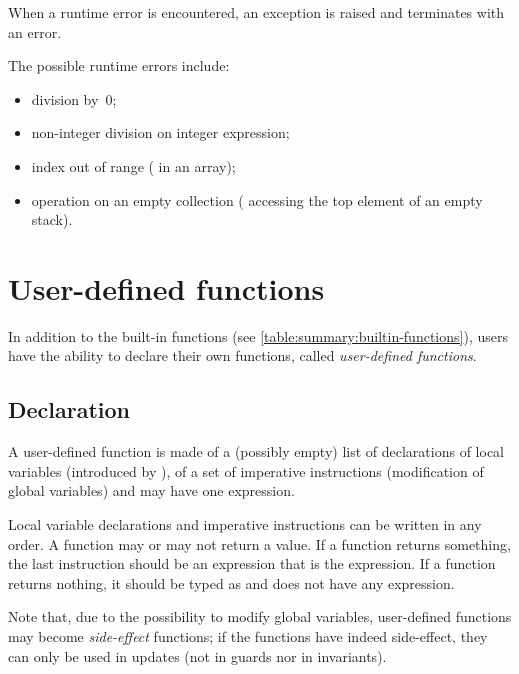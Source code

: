 When a runtime error is encountered, an exception is raised and \imitator{} terminates with an error.

The possible runtime errors include:
\begin{itemize}
	\item division by~0;
	\item non-integer division on integer expression;
	\item index out of range (\eg{} in an array);
	\item operation on an empty collection (\eg{} accessing the top element of an empty stack).
\end{itemize}


\section{User-defined functions}\label{section:user_defined_functions}

In addition to the built-in functions (see \cref{table:summary:builtin-functions}), users have the ability to declare their own functions, called \emph{user-defined functions}.

\subsection{Declaration}

A user-defined function is made of a (possibly empty) list of declarations of local variables (introduced by ), of a set of imperative instructions (modification of global variables) and may have one  expression.

Local variable declarations and imperative instructions can be written in any order.
A function may or may not return a value.
If a function returns something, the last instruction should be an expression that is the  expression.
If a function returns nothing, it should be typed as  and does not have any  expression.

Note that, due to the possibility to modify global variables, user-defined functions may become \emph{side-effect} functions; if the functions have indeed side-effect, they can only be used in updates (not in guards nor in invariants).

